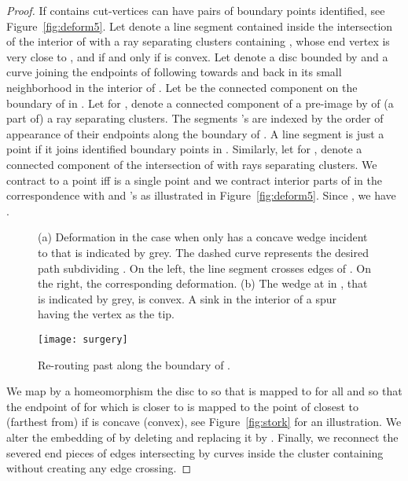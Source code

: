 \documentclass{llncs}
\begin{document}
\begin{proof}
 If  contains cut-vertices  can have pairs of boundary points identified, see Figure~\ref{fig:deform5}.
Let  denote  a line segment contained inside the intersection of the interior of  with a ray separating clusters containing , whose end vertex is very close to , and  if and only if  is convex. Let  denote a disc bounded by  and a curve 
joining the endpoints of  following  towards  and back in its small neighborhood in the interior of .
Let  be the connected component on the boundary of  in .
Let  for , denote a connected component of a pre-image by  of (a part of) a ray separating clusters. The segments 
's are indexed by the order of appearance of their endpoints along the boundary of .
A line segment  is just a point if it joins identified boundary points in .
Similarly, let  for , denote a connected component of the 
intersection of  with rays separating clusters.
We contract  to a point iff  is a single point
and we  contract  interior parts of  in the correspondence with  and 's as illustrated in Figure~\ref{fig:deform5}. Since , we have .

 
 

 \begin{figure}[h]
  \centering
\centering
{}
    	\hspace{3px}

\caption{(a) Deformation in the case when only  has a concave wedge incident to  that is indicated by grey.
The dashed curve represents the desired path subdividing .
On the left, the line segment  crosses  edges of . 
On the right, the corresponding deformation. (b) The wedge at 
in , that is indicated by grey, is convex.  A sink   in the interior of a spur having the vertex 
as the tip.}
\end{figure}




\begin{figure}
 \centering
\texttt{[image: surgery]}
\caption{Re-routing  past  along the boundary of .}
\label{fig:deform8} 
\end{figure}

We map by a homeomorphism  the disc  to  so that 
is mapped to  for all 
and so that the endpoint  of  for which  is closer to  is mapped to the point of  closest to (farthest from) 
 if  is concave (convex), see Figure~\ref{fig:stork} for an illustration.
We alter the embedding of  by deleting  and replacing it
by .
Finally, we  reconnect the severed end pieces of edges intersecting  by curves inside the cluster containing  without
creating any edge crossing. 




\end{proof}
\end{document}
